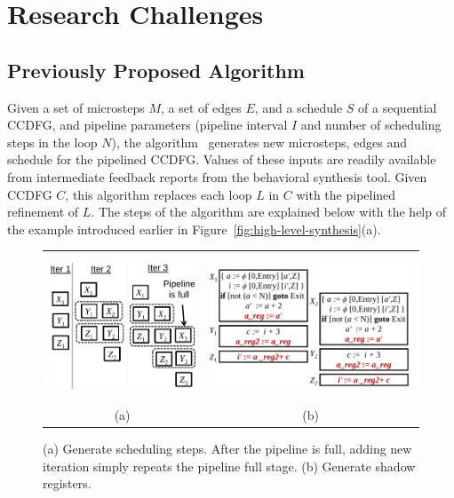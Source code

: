 \chapter{Research Challenges}
\label{sec:challenges}

\section{Previously Proposed Algorithm}
\label{subsec:kecheng's algorithm}

\noindent
Given a set of microsteps $M$, a set of edges $E$, and a schedule $S$ of a
sequential CCDFG, and pipeline parameters (pipeline
interval $I$ and number of scheduling steps in the loop
$N$), the algorithm~\cite{hrx:dac-12} generates new microsteps, edges and
schedule for the pipelined CCDFG. Values of these inputs are readily available from
intermediate feedback reports from the behavioral synthesis
tool. Given CCDFG $C$, this algorithm replaces
each loop $L$ in $C$ with the pipelined refinement of
$L$. The steps of the algorithm are explained below with the
help of the example introduced earlier in Figure~\ref{fig:high-level-synthesis}(a).

\begin{figure}
\begin{center}
\begin{tabular}{cc}
\includegraphics[height=1.7in]{fig-proposal/generate-scheduling-steps}
& %
\includegraphics[height=1.7in]{fig-proposal/shadow-reg}
\\
(a) & (b)
\end{tabular}
\end{center}
\caption{(a) Generate scheduling steps. After the pipeline is full, adding new iteration simply repeats the pipeline full stage. (b) Generate shadow registers.}
\label{fig:algorithm}
\end{figure}

